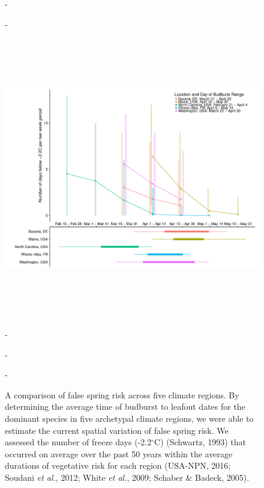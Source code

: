 \documentclass{article}\usepackage[]{graphicx}\usepackage[]{color}
\begin{document}
\begin{figure} [H] 
 -\begin{center}
 -\includegraphics[width=16cm, height=13cm]{..//figure/RegRisk_clean.pdf} 
 -\caption{A comparison of false spring risk across five climate regions. By determining the average time of budburst to leafout dates for the dominant species in five archetypal climate regions, we were able to estimate the current spatial variation of false spring risk. We assessed the number of freeze days (-2.2$^{\circ}$C) (Schwartz, 1993) that occurred on average over the past 50 years within the average durations of vegetative risk for each region (USA-NPN, 2016; Soudani \textit{et al.}, 2012; White \textit{et al.}, 2009; Schaber \& Badeck, 2005).}\label{fig:regional} 
 -\end{center}
 -\end{figure}
\end{document}
